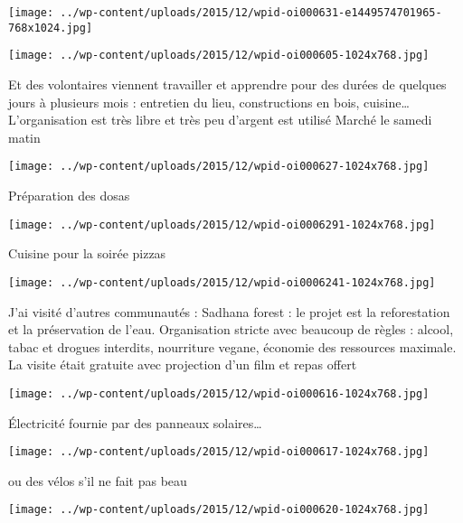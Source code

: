 \centerline{\texttt{[image: ../wp-content/uploads/2015/12/wpid-oi000631-e1449574701965-768x1024.jpg]} } 
 \newline
 \newline
\centerline{\texttt{[image: ../wp-content/uploads/2015/12/wpid-oi000605-1024x768.jpg]} } 
 \newline
 Et des volontaires viennent travailler et apprendre pour des durées de quelques jours à plusieurs mois : entretien du lieu, constructions en bois, cuisine… L'organisation est très libre et très peu d'argent est utilisé \newline
 Marché le samedi matin \newline
 \newline
\centerline{\texttt{[image: ../wp-content/uploads/2015/12/wpid-oi000627-1024x768.jpg]} } 
 \newline
 Préparation des dosas \newline
 \newline
\centerline{\texttt{[image: ../wp-content/uploads/2015/12/wpid-oi0006291-1024x768.jpg]} } 
 \newline
 Cuisine pour la soirée pizzas \newline
 \newline
\centerline{\texttt{[image: ../wp-content/uploads/2015/12/wpid-oi0006241-1024x768.jpg]} } 
 \newline
 J'ai visité d'autres communautés : \newline
 Sadhana forest : le projet est la reforestation et la préservation de l'eau. Organisation stricte avec beaucoup de règles : alcool, tabac et drogues interdits, nourriture vegane, économie des ressources maximale. La visite était gratuite avec projection d'un film et repas offert \newline
 \newline
\centerline{\texttt{[image: ../wp-content/uploads/2015/12/wpid-oi000616-1024x768.jpg]} } 
 \newline
 Électricité fournie par des panneaux solaires… \newline
 \newline
\centerline{\texttt{[image: ../wp-content/uploads/2015/12/wpid-oi000617-1024x768.jpg]} } 
 \newline
 ou des vélos s'il ne fait pas beau \newline
 \newline
\centerline{\texttt{[image: ../wp-content/uploads/2015/12/wpid-oi000620-1024x768.jpg]} } 
